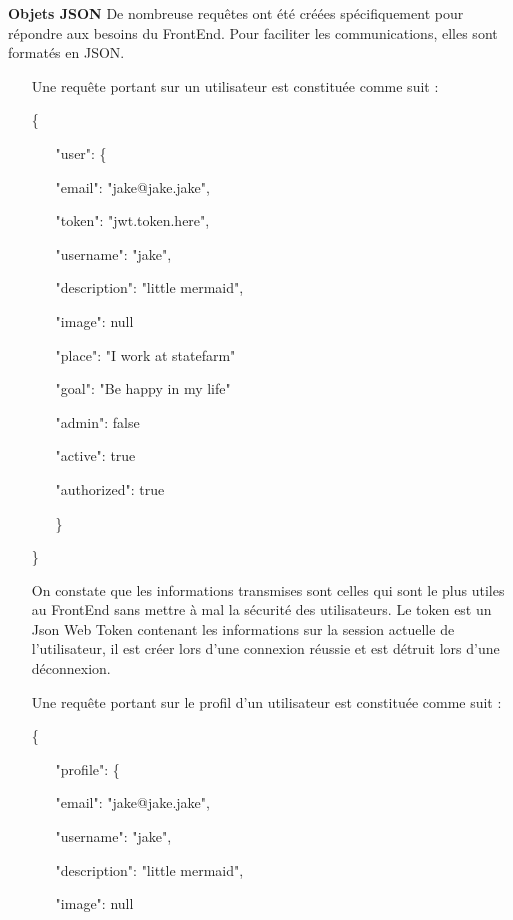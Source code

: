 \documentclass{article}
\begin{document}
\textbf{Objets JSON}
\newline
\newline
De nombreuse requêtes ont été créées spécifiquement pour répondre aux besoins du FrontEnd. Pour faciliter les communications, elles sont formatés en JSON.
\begin{itemize}
	\item[]Une requête portant sur un utilisateur est constituée comme suit :
	\item[\{]
	\item[]
	\begin{itemize}
		\item["user": \{]
			\item[]"email": "jake@jake.jake",
			\item[]"token": "jwt.token.here",
			\item[]"username": "jake",
			\item[]"description": "little mermaid",
			\item[]"image": null
			\item[]"place": "I work at statefarm"
			\item[]"goal": "Be happy in my life"
			\item[]"admin": false
			\item[]"active": true
			\item[]"authorized": true
		\item[\}]
	\end{itemize}
	\item[\}]
	\item[]On constate que les informations transmises sont celles qui sont le plus utiles au FrontEnd sans mettre à mal la sécurité des utilisateurs. Le token est un Json Web Token contenant les informations sur la session actuelle de l'utilisateur, il est créer lors d'une connexion réussie et est détruit lors d'une déconnexion.
	\item[]
	\item[]Une requête portant sur le profil d'un utilisateur est constituée comme suit :
	\item[\{]
	\item[]
	\begin{itemize}
		\item["profile": \{]
			\item[]"email": "jake@jake.jake",
			\item[]"username": "jake",
			\item[]"description": "little mermaid",
			\item[]"image": null

\end{itemize}
\end{itemize}
\end{document}
